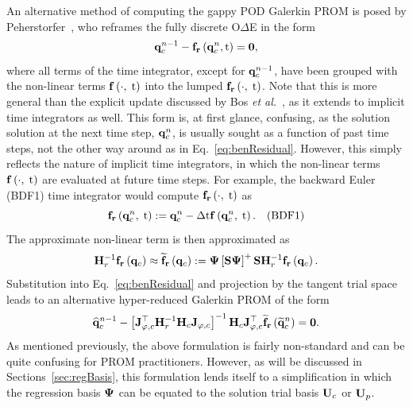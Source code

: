 An alternative method of computing the gappy POD Galerkin PROM is posed by Peherstorfer~\cite{Peherstorfer2020Adaptive}, who reframes the fully discrete O$\Delta$E in the form
%
\begin{equation}\label{eq:benResidual}
	\mathbf{q}_{c}^{n-1} - \mathbf{f}_{\mathbf{r}}\left(\mathbf{q}_{c}^{n}, \text{t}\right) = \mathbf{0},
\end{equation}
%
where all terms of the time integrator, except for $\mathbf{q}_{c}^{n - 1}$, have been grouped with the non-linear terms $\mathbf{f} \left(\cdot, \; \text{t}\right)$ into the lumped $\mathbf{f}_{\mathbf{r}}\left(\cdot, \; \text{t}\right)$. Note that this is more general than the explicit update discussed by Bos \textit{et al.}~\cite{Bos2004}, as it extends to implicit time integrators as well. This form is, at first glance, confusing, as the solution solution at the next time step, $\mathbf{q}_{c}^{n}$, is usually sought as a function of past time steps, not the other way around as in Eq.~\ref{eq:benResidual}. However, this simply reflects the nature of implicit time integrators, in which the non-linear terms $\mathbf{f} \left(\cdot, \; \text{t}\right)$ are evaluated at future time steps. For example, the backward Euler (BDF1) time integrator would compute $\mathbf{f}_{\mathbf{r}}\left(\cdot, \; \text{t}\right)$ as
%
\begin{equation}
	\mathbf{f}_{\mathbf{r}}\left(\mathbf{q}_{c}^{n}, \; \text{t}\right) := \mathbf{q}_{c}^{n} - \Delta \text{t} \mathbf{f} \left(\mathbf{q}_{c}^{n}, \; \text{t}\right). \quad \text{(BDF1)}
\end{equation}
%
The approximate non-linear term is then approximated as
%
\begin{equation}
	\resScaleInv \rhsResFunc{\consVec} \approx \rhsResApproxFunc{\consVec} \defEq \deimBasis \left[\sampMat \deimBasis \right]^+ \sampMat \resScaleInv \rhsResFunc{\consVec}.
\end{equation}
%
Substitution into Eq.~\ref{eq:benResidual} and projection by the tangent trial space leads to an alternative hyper-reduced Galerkin PROM of the form
%
\begin{equation}
    \consVecCoef^{\timeIdx-1} - \left[\jacobTrialCons^\top \resScaleInv \jacobDecodeCons\right]^{-1} \jacobDecodeCons^\top \rhsResApproxFunc{\consVecRom^{\timeIdx}} = \zeroVec.
\end{equation}
%
As mentioned previously, the above formulation is fairly non-standard and can be quite confusing for PROM practitioners. However, as will be discussed in Sections~\ref{sec:regBasis}, this formulation lends itself to a simplification in which the regression basis $\deimBasis$ can be equated to the solution trial basis $\consTrial$ or $\primTrial$.

